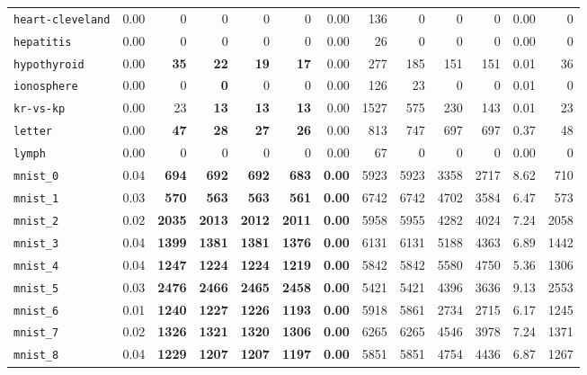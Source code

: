 \begin{tabular}{lrrrrrrrrrrrr}
\texttt{heart-cleveland} & 0.00 & 0 & 0 & 0 & 0 & 0.00 & 136 & 0 & 0 & 0 & 0.00 & 0\\
\texttt{hepatitis} & 0.00 & 0 & 0 & 0 & 0 & 0.00 & 26 & 0 & 0 & 0 & 0.00 & 0\\
\texttt{hypothyroid} & 0.00 & \textbf{35} & \textbf{22} & \textbf{19} & \textbf{17} & 0.00 & 277 & 185 & 151 & 151 & 0.01 & 36\\
\texttt{ionosphere} & 0.00 & 0 & \textbf{0} & 0 & 0 & 0.00 & 126 & 23 & 0 & 0 & 0.01 & 0\\
\texttt{kr-vs-kp} & 0.00 & 23 & \textbf{13} & \textbf{13} & \textbf{13} & 0.00 & 1527 & 575 & 230 & 143 & 0.01 & 23\\
\texttt{letter} & 0.00 & \textbf{47} & \textbf{28} & \textbf{27} & \textbf{26} & 0.00 & 813 & 747 & 697 & 697 & 0.37 & 48\\
\texttt{lymph} & 0.00 & 0 & 0 & 0 & 0 & 0.00 & 67 & 0 & 0 & 0 & 0.00 & 0\\
\texttt{mnist\_0} & 0.04 & \textbf{694} & \textbf{692} & \textbf{692} & \textbf{683} & \textbf{0.00} & 5923 & 5923 & 3358 & 2717 & 8.62 & 710\\
\texttt{mnist\_1} & 0.03 & \textbf{570} & \textbf{563} & \textbf{563} & \textbf{561} & \textbf{0.00} & 6742 & 6742 & 4702 & 3584 & 6.47 & 573\\
\texttt{mnist\_2} & 0.02 & \textbf{2035} & \textbf{2013} & \textbf{2012} & \textbf{2011} & \textbf{0.00} & 5958 & 5955 & 4282 & 4024 & 7.24 & 2058\\
\texttt{mnist\_3} & 0.04 & \textbf{1399} & \textbf{1381} & \textbf{1381} & \textbf{1376} & \textbf{0.00} & 6131 & 6131 & 5188 & 4363 & 6.89 & 1442\\
\texttt{mnist\_4} & 0.04 & \textbf{1247} & \textbf{1224} & \textbf{1224} & \textbf{1219} & \textbf{0.00} & 5842 & 5842 & 5580 & 4750 & 5.36 & 1306\\
\texttt{mnist\_5} & 0.03 & \textbf{2476} & \textbf{2466} & \textbf{2465} & \textbf{2458} & \textbf{0.00} & 5421 & 5421 & 4396 & 3636 & 9.13 & 2553\\
\texttt{mnist\_6} & 0.01 & \textbf{1240} & \textbf{1227} & \textbf{1226} & \textbf{1193} & \textbf{0.00} & 5918 & 5861 & 2734 & 2715 & 6.17 & 1245\\
\texttt{mnist\_7} & 0.02 & \textbf{1326} & \textbf{1321} & \textbf{1320} & \textbf{1306} & \textbf{0.00} & 6265 & 6265 & 4546 & 3978 & 7.24 & 1371\\
\texttt{mnist\_8} & 0.04 & \textbf{1229} & \textbf{1207} & \textbf{1207} & \textbf{1197} & \textbf{0.00} & 5851 & 5851 & 4754 & 4436 & 6.87 & 1267\\

\end{tabular}
